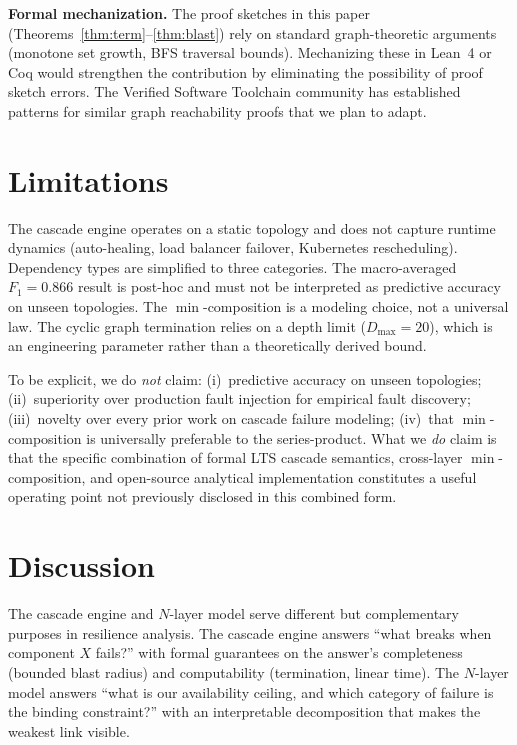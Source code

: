 \documentclass[conference,10pt]{IEEEtran}
\begin{document}
\textbf{Formal mechanization.}
The proof sketches in this paper (Theorems~\ref{thm:term}--\ref{thm:blast})
rely on standard graph-theoretic arguments (monotone set growth,
BFS traversal bounds). Mechanizing these in Lean~4 or Coq would
strengthen the contribution by eliminating the possibility of
proof sketch errors. The Verified Software Toolchain community
has established patterns for similar graph reachability proofs
that we plan to adapt.

\section{Limitations}

The cascade engine operates on a static topology and does not
capture runtime dynamics (auto-healing, load balancer failover,
Kubernetes rescheduling). Dependency types are simplified to three
categories. The macro-averaged $F_1 = 0.866$ result is post-hoc and must not be
interpreted as predictive accuracy on unseen topologies. The $\min$-composition is a
modeling choice, not a universal law. The cyclic graph termination
relies on a depth limit ($D_{\max} = 20$), which is an engineering
parameter rather than a theoretically derived bound.

To be explicit, we do \emph{not} claim: (i)~predictive accuracy
on unseen topologies; (ii)~superiority over production fault
injection for empirical fault discovery; (iii)~novelty over every
prior work on cascade failure modeling; (iv)~that
$\min$-composition is universally preferable to the series-product.
What we \emph{do} claim is that the specific combination of
formal LTS cascade semantics, cross-layer $\min$-composition,
and open-source analytical implementation constitutes a useful
operating point not previously disclosed in this combined form.

\section{Discussion}

The cascade engine and $N$-layer model serve different but
complementary purposes in resilience analysis.
The cascade engine answers ``what breaks when component $X$ fails?''
with formal guarantees on the answer's completeness (bounded blast
radius) and computability (termination, linear time).
The $N$-layer model answers ``what is our availability ceiling, and
which category of failure is the binding constraint?'' with an
interpretable decomposition that makes the weakest link visible.
\end{document}
